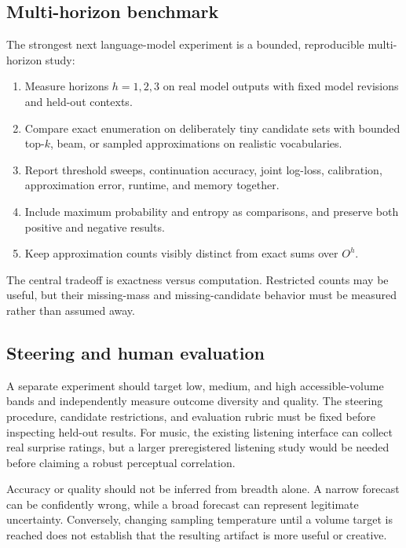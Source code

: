 \documentclass[11pt,a4paper]{article}
\begin{document}
\subsection{Multi-horizon benchmark}
The strongest next language-model experiment is a bounded, reproducible multi-horizon study:
\begin{enumerate}[nosep]
  \item Measure horizons $h=1,2,3$ on real model outputs with fixed model revisions and held-out contexts.
  \item Compare exact enumeration on deliberately tiny candidate sets with bounded top-$k$, beam, or sampled approximations on realistic vocabularies.
  \item Report threshold sweeps, continuation accuracy, joint log-loss, calibration, approximation error, runtime, and memory together.
  \item Include maximum probability and entropy as comparisons, and preserve both positive and negative results.
  \item Keep approximation counts visibly distinct from exact sums over $O^h$.
\end{enumerate}
The central tradeoff is exactness versus computation. Restricted counts may be useful, but their missing-mass and missing-candidate behavior must be measured rather than assumed away.

\subsection{Steering and human evaluation}
A separate experiment should target low, medium, and high accessible-volume bands and independently measure outcome diversity and quality. The steering procedure, candidate restrictions, and evaluation rubric must be fixed before inspecting held-out results. For music, the existing listening interface can collect real surprise ratings, but a larger preregistered listening study would be needed before claiming a robust perceptual correlation.

Accuracy or quality should not be inferred from breadth alone. A narrow forecast can be confidently wrong, while a broad forecast can represent legitimate uncertainty. Conversely, changing sampling temperature until a volume target is reached does not establish that the resulting artifact is more useful or creative.
\end{document}
